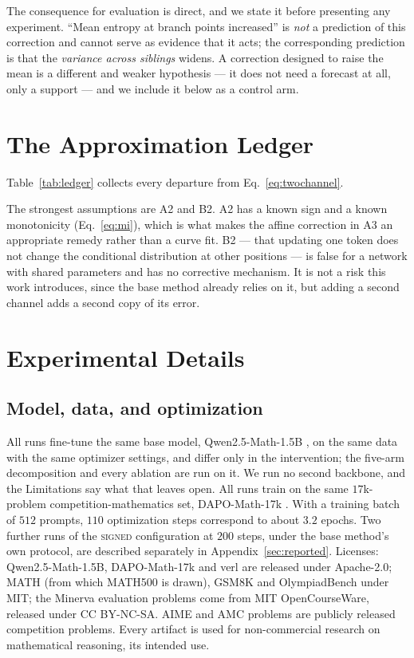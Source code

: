 \documentclass[11pt]{article}
\begin{document}
The consequence for evaluation is direct, and we state it before presenting any
experiment. ``Mean entropy at branch points increased'' is \emph{not} a prediction of
this correction and cannot serve as evidence that it acts; the corresponding prediction
is that the \emph{variance across siblings} widens. A correction designed to raise the
mean is a different and weaker hypothesis --- it does not need a forecast at all,
only a support --- and we include it below as a control arm.


\section{The Approximation Ledger}
\label{sec:ledger}

Table~\ref{tab:ledger} collects every departure from Eq.~\eqref{eq:twochannel}.


The strongest assumptions are A2 and B2. A2 has a known sign and a known monotonicity
(Eq.~\ref{eq:mi}), which is what makes the affine correction in A3 an appropriate
remedy rather than a curve fit. B2 --- that updating one token does not change the
conditional distribution at other positions --- is false for a network with shared
parameters and has no corrective mechanism. It is not a risk this work introduces,
since the base method already relies on it, but adding a second channel adds a second
copy of its error.


\section{Experimental Details}
\label{sec:setup-app}
\subsection{Model, data, and optimization}

All runs fine-tune the same base model, Qwen2.5-Math-1.5B \citep{yang2024aqwen}, on the same data with
the same optimizer settings, and differ only in the intervention; the five-arm
decomposition and every ablation are run on it. We run no second backbone, and the
Limitations say what that leaves open. All runs train on the same $17$k-problem
competition-mathematics set, DAPO-Math-17k \citep{yu2025dapo}. With a training batch of $512$ prompts,
$110$ optimization steps correspond to about $3.2$ epochs. Two further runs of the
\textsc{signed} configuration at $200$ steps, under the base method's own protocol, are described
separately in Appendix~\ref{sec:reported}.
Licenses: Qwen2.5-Math-1.5B, DAPO-Math-17k and verl are released under Apache-2.0;
MATH (from which MATH500 is drawn), GSM8K and OlympiadBench under MIT; the Minerva
evaluation problems come from MIT OpenCourseWare, released under CC BY-NC-SA. AIME and
AMC problems are publicly released competition problems. Every artifact is used for
non-commercial research on mathematical reasoning, its intended use.
\end{document}
